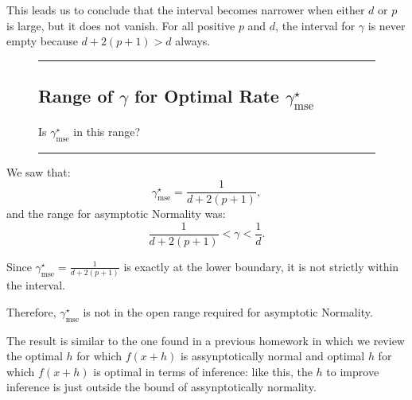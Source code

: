 \documentclass{article}
\newenvironment{colorparagraph}[1]{\par\color{#1}}{\par}
\begin{document}
This leads us to conclude that the interval becomes narrower when either \( d \) or \( p \) is large, but it does not vanish. For all positive \( p \) and \( d \), the interval for \(\gamma\) is never empty because \( d+2(p+1) > d \) always.

\begin{figure}[H]
  \begin{colorparagraph}{questioncolor}
  \rule{\textwidth}{0.5pt}
  \label{q1f}
  \subsection{Range of \(\gamma\) for Optimal Rate \(\gamma^\star_{\text{mse}}\)}

  Is \( \gamma^\star_{\text{mse}} \) in this range?

  \rule{\textwidth}{0.5pt}
  \end{colorparagraph}
\end{figure}

We saw that:
\[
\gamma^\star_{\text{mse}} = \frac{1}{d+2(p+1)},
\]
and the range for asymptotic Normality was:
\[
\frac{1}{d+2(p+1)} < \gamma < \frac{1}{d}.
\]

Since \(\gamma^\star_{\text{mse}} = \frac{1}{d+2(p+1)}\) is exactly at the lower boundary, it is not strictly within the interval.

Therefore, \(\gamma^\star_{\text{mse}}\) is not in the open range required for asymptotic Normality.

The result is similar to the one found in a previous homework in which we review the optimal $h$ for which $f(x+h)$ is assynptotically normal and optimal $h$ for which $f(x+h)$ is optimal in terms of inference: like this, the $h$ to improve inference is just outside the bound of assynptotically normality.
\end{document}
